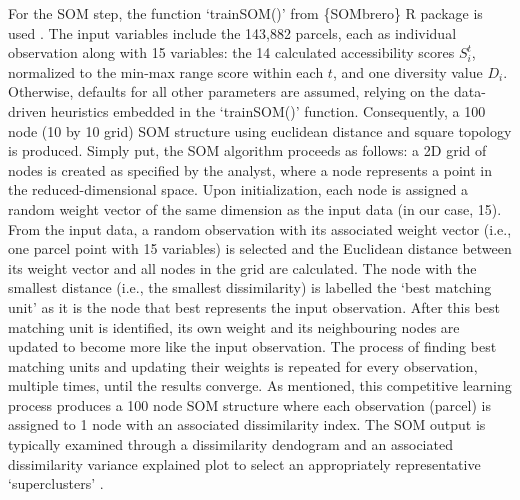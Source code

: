 \documentclass[
  authoryear,
  preprint,
  3p]{elsarticle}
\begin{document}
For the SOM step, the function `trainSOM()' from \{SOMbrero\} R package
is used \citep{VillaVialaneix2017}. The input variables include the
143,882 parcels, each as individual observation along with 15 variables:
the 14 calculated accessibility scores \(S_i^t\), normalized to the
min-max range score within each \(t\), and one diversity value \(D_i\).
Otherwise, defaults for all other parameters are assumed, relying on the
data-driven heuristics embedded in the `trainSOM()' function.
Consequently, a 100 node (10 by 10 grid) SOM structure using euclidean
distance and square topology is produced. Simply put, the SOM algorithm
proceeds as follows: a 2D grid of nodes is created as specified by the
analyst, where a node represents a point in the reduced-dimensional
space. Upon initialization, each node is assigned a random weight vector
of the same dimension as the input data (in our case, 15). From the
input data, a random observation with its associated weight vector
(i.e., one parcel point with 15 variables) is selected and the Euclidean
distance between its weight vector and all nodes in the grid are
calculated. The node with the smallest distance (i.e., the smallest
dissimilarity) is labelled the `best matching unit' as it is the node
that best represents the input observation. After this best matching
unit is identified, its own weight and its neighbouring nodes are
updated to become more like the input observation. The process of
finding best matching units and updating their weights is repeated for
every observation, multiple times, until the results converge. As
mentioned, this competitive learning process produces a 100 node SOM
structure where each observation (parcel) is assigned to 1 node with an
associated dissimilarity index. The SOM output is typically examined
through a dissimilarity dendogram and an associated dissimilarity
variance explained plot to select an appropriately representative
`superclusters'
\citep{VillaVialaneix2017, victorianoTimeSpaceMoney2020}.
\end{document}
